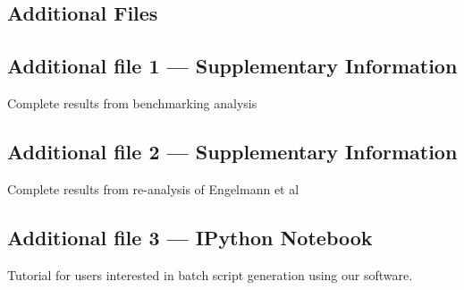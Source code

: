 \documentclass[linenumbers, doublespacing]{bmcart}
\begin{document}
\begin{backmatter}

\section*{Additional Files}
  \subsection*{Additional file 1 --- Supplementary Information}
	Complete results from benchmarking analysis
  \subsection*{Additional file 2 --- Supplementary Information}
    Complete results from re-analysis of Engelmann et al
  \subsection*{Additional file 3 --- IPython Notebook}
    Tutorial for users interested in batch script generation using our software. 


\end{backmatter}
\end{document}
